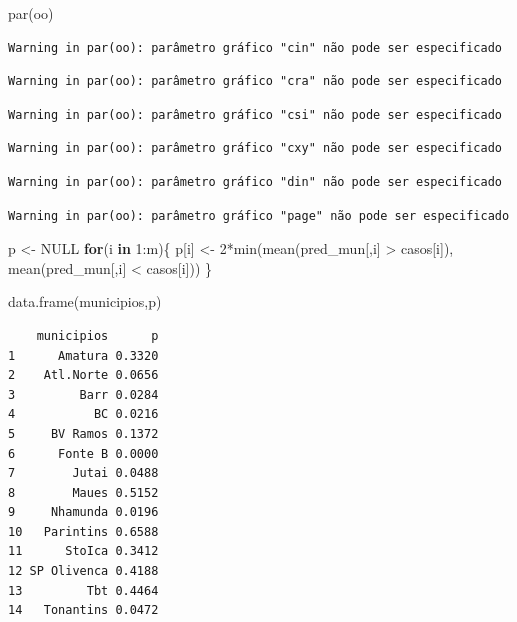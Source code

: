 \documentclass[
  letterpaper,
  DIV=11,
  numbers=noendperiod]{scrreprt}
\newenvironment{Shaded}{\begin{snugshade}}{\end{snugshade}}
\newcommand{\ConstantTok}[1]{\textcolor[rgb]{0.56,0.35,0.01}{#1}}
\newcommand{\ControlFlowTok}[1]{\textcolor[rgb]{0.00,0.23,0.31}{\textbf{#1}}}
\newcommand{\DecValTok}[1]{\textcolor[rgb]{0.68,0.00,0.00}{#1}}
\newcommand{\FunctionTok}[1]{\textcolor[rgb]{0.28,0.35,0.67}{#1}}
\newcommand{\NormalTok}[1]{\textcolor[rgb]{0.00,0.23,0.31}{#1}}
\newcommand{\OtherTok}[1]{\textcolor[rgb]{0.00,0.23,0.31}{#1}}
\newcommand{\SpecialCharTok}[1]{\textcolor[rgb]{0.37,0.37,0.37}{#1}}
\theoremstyle{definition}
\theoremstyle{definition}
\theoremstyle{plain}
\theoremstyle{remark}
\begin{document}
\begin{Shaded}
\begin{Highlighting}[]
\FunctionTok{par}\NormalTok{(oo)}
\end{Highlighting}
\end{Shaded}

\begin{verbatim}
Warning in par(oo): parâmetro gráfico "cin" não pode ser especificado
\end{verbatim}

\begin{verbatim}
Warning in par(oo): parâmetro gráfico "cra" não pode ser especificado
\end{verbatim}

\begin{verbatim}
Warning in par(oo): parâmetro gráfico "csi" não pode ser especificado
\end{verbatim}

\begin{verbatim}
Warning in par(oo): parâmetro gráfico "cxy" não pode ser especificado
\end{verbatim}

\begin{verbatim}
Warning in par(oo): parâmetro gráfico "din" não pode ser especificado
\end{verbatim}

\begin{verbatim}
Warning in par(oo): parâmetro gráfico "page" não pode ser especificado
\end{verbatim}

\begin{Shaded}
\begin{Highlighting}[]
\NormalTok{p }\OtherTok{\textless{}{-}} \ConstantTok{NULL}
\ControlFlowTok{for}\NormalTok{(i }\ControlFlowTok{in} \DecValTok{1}\SpecialCharTok{:}\NormalTok{m)\{}
\NormalTok{p[i] }\OtherTok{\textless{}{-}} \DecValTok{2}\SpecialCharTok{*}\FunctionTok{min}\NormalTok{(}\FunctionTok{mean}\NormalTok{(pred\_mun[,i] }\SpecialCharTok{\textgreater{}}\NormalTok{ casos[i]),}
\FunctionTok{mean}\NormalTok{(pred\_mun[,i] }\SpecialCharTok{\textless{}}\NormalTok{ casos[i]))}
\NormalTok{\}}

\FunctionTok{data.frame}\NormalTok{(municipios,p)}
\end{Highlighting}
\end{Shaded}

\begin{verbatim}
    municipios      p
1      Amatura 0.3320
2    Atl.Norte 0.0656
3         Barr 0.0284
4           BC 0.0216
5     BV Ramos 0.1372
6      Fonte B 0.0000
7        Jutai 0.0488
8        Maues 0.5152
9     Nhamunda 0.0196
10   Parintins 0.6588
11      StoIca 0.3412
12 SP Olivenca 0.4188
13         Tbt 0.4464
14   Tonantins 0.0472
\end{verbatim}
\end{document}
